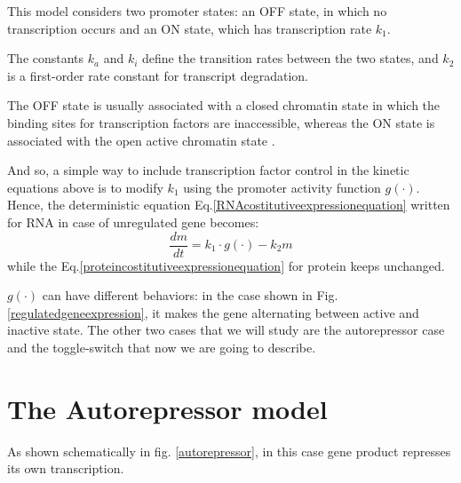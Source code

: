 \documentclass[12pt,a4paper]{report}
\begin{document}
This model considers two promoter states: an OFF state, in which no transcription occurs and an ON state, which has transcription rate $k_{1}$. 

The constants $k_{a}$ and $k_{i}$ define the transition rates between the two states, and $k_{2}$ is a first-order rate constant for transcript degradation.

The OFF state is usually associated with a closed chromatin state in which the binding sites for transcription factors are inaccessible, whereas the ON state is associated with the open active chromatin state \cite{geneexpressionnoise}.

And so, a simple way to include transcription factor control in the kinetic equations above is to modify $k_{1}$ using the promoter activity function $g( \cdot )$. Hence, the deterministic equation Eq.\ref{RNAcostitutiveexpressionequation} written for RNA in case of unregulated gene becomes:
\begin{equation}\label{regulatedgeneequation}
 \frac{dm}{dt} = k_{1} \cdot g(\cdot) - k_{2}m
\end{equation}
while the Eq.\ref{proteincostitutiveexpressionequation} for protein keeps unchanged.

$g( \cdot )$ can have different behaviors: in the case shown in Fig. \ref{regulatedgeneexpression}, it makes the gene alternating between active and inactive state. The other two cases that we will study are the autorepressor case and the toggle-switch that now we are going to describe.






\section{The Autorepressor model}

As shown schematically in fig. \ref{autorepressor}, in this case gene product represses its own transcription. 
\end{document}
